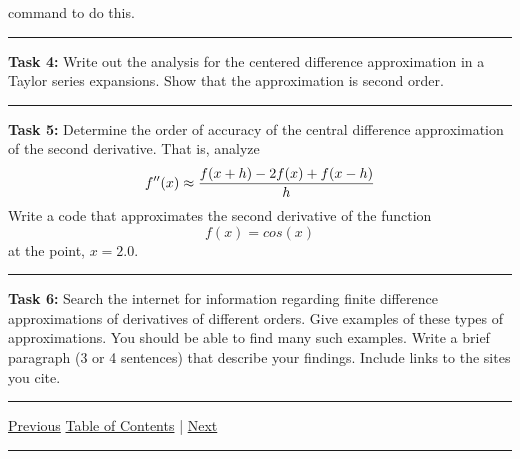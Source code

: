 \documentclass[10pt,fleqn]{article}
\begin{document}
\begin{trivlist}
\begin{verbatim}
        \end{verbatim}
        command to do this.
\vskip0.1in\hrule\vskip0.1in \noindent
  \item[\bf Task 4:] Write out the analysis for the centered difference
        approximation in a Taylor series expansions. Show that the approximation
        is second order.
\vskip0.1in\hrule\vskip0.1in \noindent
  \item[\bf Task 5:] Determine the order of accuracy of the central difference
        approximation of the second derivative. That is, analyze
        \[
          f''(x) \approx {{f(x+h) - 2 f(x) + f(x-h)}\over{h}}
        \]
        Write a code that approximates the second derivative of the function
        \[
          f(x) = cos(x)
        \] 
        at the point, \(x=2.0\).
\vskip0.1in\hrule\vskip0.1in \noindent
  \item[\bf Task 6:] Search the internet for information regarding finite
        difference approximations of derivatives of different orders. Give
        examples of these types of approximations. You should be able to find
        many such examples. Write a brief paragraph (3 or 4 sentences) that
        describe your findings. Include links to the sites you cite.
\end{trivlist}
\vskip0.1in\hrule\vskip0.1in \noindent
  \href{../../tasksheet_02/html/tasksheet_02.html}{Previous}
  \href{../../toc/md/tasksheet_toc.md}{Table of Contents} |
  \href{../../tasksheet_04/html/tasksheet_04.html}{Next}
\vskip0.1in\hrule\vskip0.1in \noindent
\end{document}
